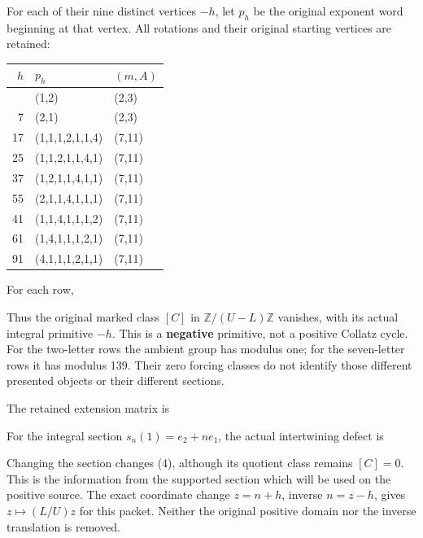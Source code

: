 For each of their nine distinct vertices \(-h\), let \(p_h\) be the
original exponent word beginning at that vertex. All rotations and their
original starting vertices are retained:

{\def\LTcaptype{none} %
\begin{longtable}[]{@{}rll@{}}
\toprule\noalign{}
\(h\) & \(p_h\) & \((m,A)\) \\
\midrule\noalign{}
\endhead
\bottomrule\noalign{}
\endlastfoot
5 & (1,2) & (2,3) \\
7 & (2,1) & (2,3) \\
17 & (1,1,1,2,1,1,4) & (7,11) \\
25 & (1,1,2,1,1,4,1) & (7,11) \\
37 & (1,2,1,1,4,1,1) & (7,11) \\
55 & (2,1,1,4,1,1,1) & (7,11) \\
41 & (1,1,4,1,1,1,2) & (7,11) \\
61 & (1,4,1,1,1,2,1) & (7,11) \\
91 & (4,1,1,1,2,1,1) & (7,11) \\
\end{longtable}
}

For each row,


Thus the original marked class \([C]\) in \(\mathbb Z/(U-L)\mathbb Z\)
vanishes, with its actual integral primitive \(-h\). This is a
\textbf{negative} primitive, not a positive Collatz cycle. For the
two-letter rows the ambient group has modulus one; for the seven-letter
rows it has modulus 139. Their zero forcing classes do not identify
those different presented objects or their different sections.

The retained extension matrix is


For the integral section \(s_n(1)=e_2+ne_1\), the actual intertwining
defect is


Changing the section changes (4), although its quotient class remains
\([C]=0\). This is the information from the supported section which will
be used on the positive source. The exact coordinate change \(z=n+h\),
inverse \(n=z-h\), gives \(z\mapsto(L/U)z\) for this packet. Neither the
original positive domain nor the inverse translation is removed.

